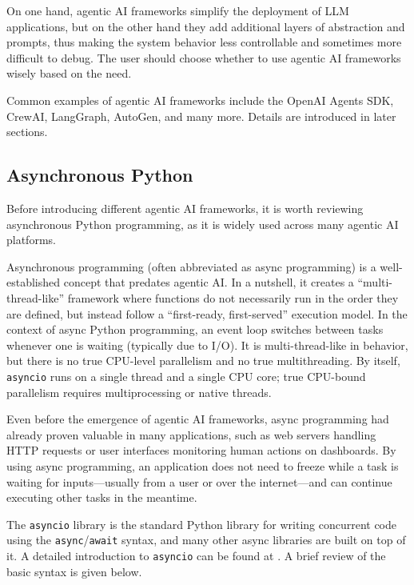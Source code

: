 On one hand, agentic AI frameworks simplify the deployment of LLM applications, but on the other hand they add additional layers of abstraction and prompts, thus making the system behavior less controllable and sometimes more difficult to debug. The user should choose whether to use agentic AI frameworks wisely based on the need.

Common examples of agentic AI frameworks include the OpenAI Agents SDK, CrewAI, LangGraph, AutoGen, and many more. Details are introduced in later sections.

\subsection{Asynchronous Python}

Before introducing different agentic AI frameworks, it is worth reviewing asynchronous Python programming, as it is widely used across many agentic AI platforms.

Asynchronous programming (often abbreviated as async programming) is a well-established concept that predates agentic AI. In a nutshell, it creates a ``multi-thread-like'' framework where functions do not necessarily run in the order they are defined, but instead follow a ``first-ready, first-served'' execution model. In the context of async Python programming, an event loop switches between tasks whenever one is waiting (typically due to I/O). It is multi-thread-like in behavior, but there is no true CPU-level parallelism and no true multithreading. By itself, \verb|asyncio| runs on a single thread and a single CPU core; true CPU-bound parallelism requires multiprocessing or native threads.

Even before the emergence of agentic AI frameworks, async programming had already proven valuable in many applications, such as web servers handling HTTP requests or user interfaces monitoring human actions on dashboards. By using async programming, an application does not need to freeze while a task is waiting for inputs—usually from a user or over the internet—and can continue executing other tasks in the meantime.

The \verb|asyncio| library is the standard Python library for writing concurrent code using the \verb|async|/\verb|await| syntax, and many other async libraries are built on top of it. A detailed introduction to \verb|asyncio| can be found at \cite{python2025asyncio}. A brief review of the basic syntax is given below.

